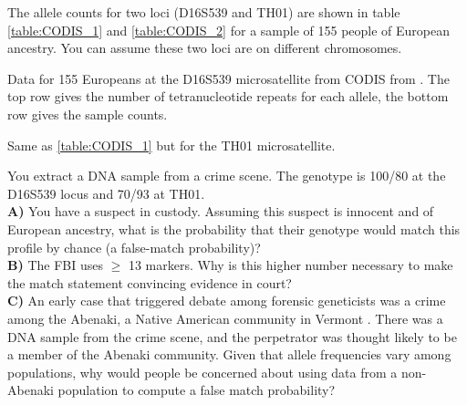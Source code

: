 The allele counts for two loci (D16S539
and TH01) are shown in table \ref{table:CODIS_1} and
\ref{table:CODIS_2} for a sample of 155 people of European ancestry. You can assume these two loci are on different chromosomes.

\begin{table}
{\small
\setlength{\tabcolsep}{.45\tabcolsep}
  \label{table:CODIS_1}
\caption{ Data for 155 Europeans at the D16S539 microsatellite from
  CODIS from \citet{algee:16}. The top row gives the number of
  tetranucleotide repeats for each allele, the bottom row gives the
  sample counts.}
 }

\end{table}
\vspace*{1cm}
\begin{table}
  {\small
\setlength{\tabcolsep}{.45\tabcolsep}
  \label{table:CODIS_2}
}

\caption{Same as \ref{table:CODIS_1} but for the TH01 microsatellite. }
\end{table}

\begin{question}{} \label{Q:CODIS}
You extract a DNA sample from a crime scene. The genotype is 100/80 at the
D16S539 locus and 70/93 at TH01.\\

{\bf A)} You have a suspect in custody. Assuming this suspect is innocent and of European ancestry, what is the probability
that their genotype would match this profile by chance (a false-match probability)?\\
{\bf B)} The FBI uses $\geq$ 13 markers. Why is this higher number
necessary to make the match statement convincing evidence in court?\\
{\bf C)}  An early case that triggered debate among forensic geneticists was a crime among the Abenaki, a Native American community in
Vermont \citep[see][for discussion]{lewontin:94}. There was a DNA sample from the crime scene, and the
perpetrator was thought likely to be a member of the Abenaki
community. Given that allele frequencies vary among populations, why would people be concerned about using data from a non-Abenaki population to compute a false match probability?
\end{question}


